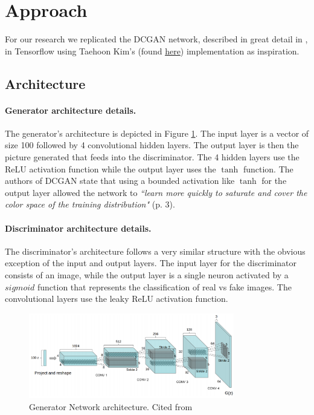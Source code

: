 
\section{Approach}
%
For our research we replicated the DCGAN network, described in great detail in \cite{DBLP:journals/corr/RadfordMC15}, in Tensorflow using Taehoon Kim's (found \href{https://github.com/carpedm20/DCGAN-tensorflow}{here}) implementation as inspiration.

\subsection{Architecture}

\paragraph{Generator architecture details.} The generator's architecture is depicted in Figure \ref{fig:architecture}. The input layer is a vector of size 100 followed by 4 convolutional hidden layers. The output layer is then the picture generated that feeds into the discriminator. The 4 hidden layers use the ReLU activation function while the output layer uses the $\tanh$ function. The authors of DCGAN state that using a bounded activation like $\tanh$ for the output layer allowed the network to \textit{``learn more quickly to saturate and cover the color space of the training distribution"} \cite{DBLP:journals/corr/RadfordMC15} (p. 3).

\paragraph{Discriminator architecture details.} The discriminator's architecture follows a very similar structure with the obvious exception of the input and output layers. The input layer for the discriminator consists of an image, while the output layer is a single neuron activated by a $sigmoid$ function that represents the classification of real vs fake images. The convolutional layers use the leaky ReLU activation function. 

\begin{figure}[h]
\centering
\includegraphics[width=0.8\textwidth]{figures/DCGAN.png}
\caption{Generator Network architecture. Cited from \cite{DBLP:journals/corr/RadfordMC15} }
\label{fig:architecture}
\end{figure}

